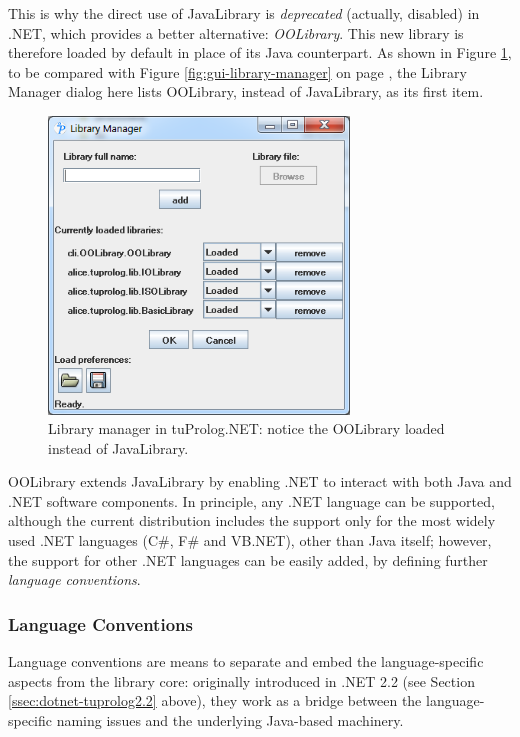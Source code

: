 This is why the direct use of JavaLibrary is \textit{deprecated} (actually, disabled) in \tuprolog{}.NET, which provides a better alternative: \textit{OOLibrary}. This new library is therefore loaded by default in place of its Java counterpart. As shown in Figure \ref{fig:dotnet-oolibrary}, to be compared with Figure \ref{fig:gui-library-manager} on page \pageref{fig:gui-library-manager}, the Library Manager dialog here lists OOLibrary, instead of JavaLibrary, as its first item.

\begin{figure}
\centering
  \includegraphics[width=8cm]{images/dotnet-oolibrary}
  \caption{Library manager in tuProlog.NET: notice the OOLibrary loaded instead of JavaLibrary.}\label{fig:dotnet-oolibrary}
\end{figure}

OOLibrary extends JavaLibrary by enabling \tuprolog{}.NET to interact with both Java and .NET software components. In principle, any .NET language can be supported, although the current distribution includes the support only for the most widely used .NET languages (C\#, F\# and VB.NET), other than Java itself; however, the support for other .NET languages can be easily added, by defining further \textit{language conventions}.

\subsubsection{Language Conventions}

Language conventions are \tuprolog{} means to separate and embed the language-specific aspects from the library core: originally introduced in \tuprolog{}.NET 2.2 (see Section \ref{ssec:dotnet-tuprolog2.2} above), they work as a bridge between the language-specific naming issues and the underlying Java-based machinery.

